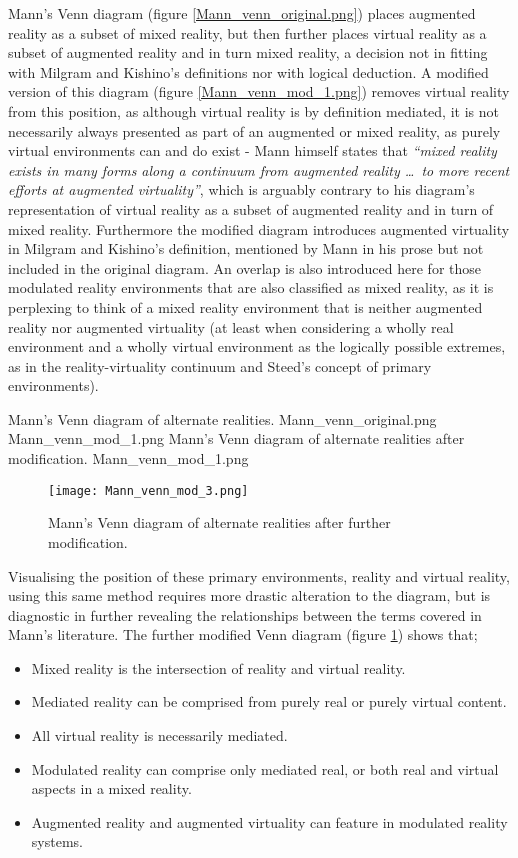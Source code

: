 Mann's Venn diagram (figure \ref{Mann_venn_original.png}) places augmented reality as a subset of mixed reality, but then further places virtual reality as a subset of augmented reality and in turn mixed reality, a decision not in fitting with Milgram and Kishino's definitions nor with logical deduction. A modified version of this diagram (figure \ref{Mann_venn_mod_1.png}) removes virtual reality from this position, as although virtual reality is by definition mediated, it is not necessarily always presented as part of an augmented or mixed reality, as purely virtual environments can and do exist - Mann himself states that \textit{``mixed reality exists in many forms along a continuum from augmented reality \ldots\ to more recent efforts at augmented virtuality''}, which is arguably contrary to his diagram's representation of virtual reality as a subset of augmented reality and in turn of mixed reality. Furthermore the modified diagram introduces augmented virtuality in Milgram and Kishino's definition, mentioned by Mann in his prose but not included in the original diagram. An overlap is also introduced here for those modulated reality environments that are also classified as mixed reality, as it is perplexing to think of a mixed reality environment that is neither augmented reality nor augmented virtuality (at least when considering a wholly real environment and a wholly virtual environment as the logically possible extremes, as in the reality-virtuality continuum and Steed's concept of primary environments).

 {Mann's Venn diagram of alternate realities.} {Mann_venn_original.png}
       {Mann_venn_mod_1.png} {Mann's Venn diagram of alternate realities after modification.} {Mann_venn_mod_1.png}

\begin{figure}[h]
\centering
  \texttt{[image: Mann\_venn\_mod\_3.png]}
  \caption{Mann's Venn diagram of alternate realities after further modification.}
  \label{Mann_venn_mod_3.png}
\end{figure}

Visualising the position of these primary environments, reality and virtual reality, using this same method requires more drastic alteration to the diagram, but is diagnostic in further revealing the relationships between the terms covered in Mann's literature. The further modified Venn diagram (figure \ref{Mann_venn_mod_3.png}) shows that;
\begin{itemize}
	\item Mixed reality is the intersection of reality and virtual reality.
	\item Mediated reality can be comprised from purely real or purely virtual content.
	\item All virtual reality is necessarily mediated.
	\item Modulated reality can comprise only mediated real, or both real and virtual aspects in a mixed reality.
	\item Augmented reality and augmented virtuality can feature in modulated reality systems.
\end{itemize}

